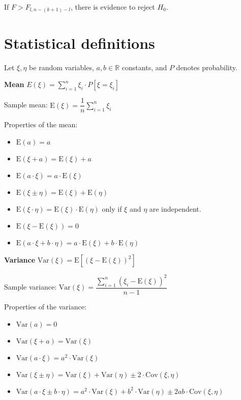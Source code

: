 \documentclass[10pt, a4paper, landscape]{article}
\newcommand{\E}{\mathrm{E}}
\newcommand{\Var}{\mathrm{Var}}
\newcommand{\Cov}{\mathrm{Cov}}
\begin{document}
\begin{multicols}{3}
		If $F > F_{l, n - (k + 1) - l}$, there is evidence to reject $H_{0}$.
		
		\section*{Statistical definitions}
		
		Let $\xi, \eta$ be random variables, $a, b \in \mathbb{R}$ constants, and $P$ denotes probability.
		
		\textbf{Mean} \quad $E(\xi) = \sum_{i=1}^{n}\xi_{i} \cdot P[\xi = \xi_{i}]$
		
		Sample mean: \quad $\E(\xi) = \dfrac{1}{n}\sum_{i=1}^{n}\xi_{i}$
		
		Properties of the mean:
		
		\begin{itemize}[leftmargin=*]
			\item $\E(a) = a$
			\item $\E(\xi + a) = \E(\xi) + a$
			\item $\E(a \cdot \xi) = a \cdot \E(\xi)$
			\item $\E(\xi \pm \eta) = \E(\xi) + \E(\eta)$
			\item $\E(\xi \cdot \eta) = \E(\xi) \cdot \E(\eta)$ \quad only if $\xi$ and $\eta$ are independent.
			\item $\E(\xi - \E(\xi)) = 0$
			\item $\E(a \cdot \xi + b \cdot \eta) = a \cdot \E(\xi) + b \cdot \E(\eta)$
		\end{itemize}
				
		\textbf{Variance} \quad $\Var(\xi) = \E[(\xi - \E(\xi))^{2}]$
		
		Sample variance: \quad $\Var(\xi) = \dfrac{\sum_{i=1}^{n} (\xi_{i} - \E(\xi))^2}{n - 1}$
			
		Properties of the variance:
		
		\begin{itemize}[leftmargin=*]
			\item $\Var(a) = 0$
			\item $\Var(\xi + a) = \Var(\xi)$
			\item $\Var(a \cdot \xi) = a^{2} \cdot \Var(\xi)$
			\item $\Var(\xi \pm \eta) = \Var(\xi) + \Var(\eta) \pm 2 \cdot \Cov(\xi, \eta)$
			\item $\Var(a \cdot \xi \pm b \cdot \eta) = a^{2} \cdot \Var(\xi) + b^{2} \cdot \Var(\eta) \pm 2 a b \cdot \Cov(\xi, \eta)$
		\end{itemize}
		

\end{multicols}
\end{document}
